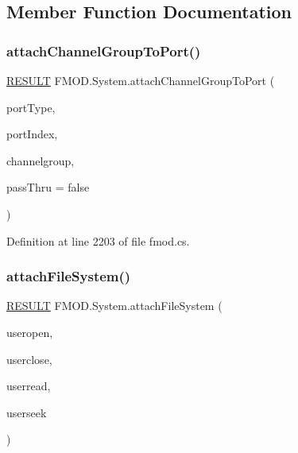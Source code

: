 \subsection{Member Function Documentation}
\mbox{\label{class_f_m_o_d_1_1_system_aa0d216725f4487725433d4dc72595936}} 
\subsubsection{\texorpdfstring{attach\+Channel\+Group\+To\+Port()}{attachChannelGroupToPort()}}
{\footnotesize\ttfamily \hyperlink{namespace_f_m_o_d_a305d1176ef3f8c8815861a60407ac33d}{R\+E\+S\+U\+LT} F\+M\+O\+D.\+System.\+attach\+Channel\+Group\+To\+Port (\begin{DoxyParamCaption}\item[{uint}]{port\+Type,  }\item[{ulong}]{port\+Index,  }\item[{\hyperlink{class_f_m_o_d_1_1_channel_group}{Channel\+Group}}]{channelgroup,  }\item[{bool}]{pass\+Thru = {\ttfamily false} }\end{DoxyParamCaption})}



Definition at line 2203 of file fmod.\+cs.

\mbox{\label{class_f_m_o_d_1_1_system_a479b01d9ae58af5ab149a7b133656248}} 
\subsubsection{\texorpdfstring{attach\+File\+System()}{attachFileSystem()}}
{\footnotesize\ttfamily \hyperlink{namespace_f_m_o_d_a305d1176ef3f8c8815861a60407ac33d}{R\+E\+S\+U\+LT} F\+M\+O\+D.\+System.\+attach\+File\+System (\begin{DoxyParamCaption}\item[{\hyperlink{namespace_f_m_o_d_a6aacb40c0bfa3448934de11beb9ed447}{F\+I\+L\+E\+\_\+\+O\+P\+E\+N\+C\+A\+L\+L\+B\+A\+CK}}]{useropen,  }\item[{\hyperlink{namespace_f_m_o_d_ae4fc590f93bf7202703858219d3b2fbd}{F\+I\+L\+E\+\_\+\+C\+L\+O\+S\+E\+C\+A\+L\+L\+B\+A\+CK}}]{userclose,  }\item[{\hyperlink{namespace_f_m_o_d_a074a94c39aa2d2569a57ed255f6c9011}{F\+I\+L\+E\+\_\+\+R\+E\+A\+D\+C\+A\+L\+L\+B\+A\+CK}}]{userread,  }\item[{\hyperlink{namespace_f_m_o_d_a5fb329aae3aea0658fa46c593359ead3}{F\+I\+L\+E\+\_\+\+S\+E\+E\+K\+C\+A\+L\+L\+B\+A\+CK}}]{userseek }\end{DoxyParamCaption})}



